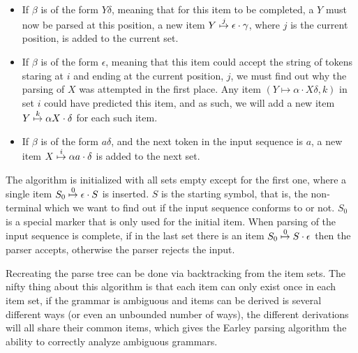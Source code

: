 		\begin{itemize}
			\item

				If $\beta$ is of the form $Y\delta$, meaning that for this item
				to be completed, a $Y$ must now be parsed at this position, a
				new item $\earley{Y}{\epsilon}{\gamma}{j}$, where $j$ is the
				current position, is added to the current set.

			\item

				If $\beta$ is of the form $\epsilon$, meaning that this item
				could accept the string of tokens staring at $i$ and ending at
				the current position, $j$, we must find out why the parsing of
				$X$ was attempted in the first place. Any item $(Y \mapsto
				\alpha \cdot X\delta, k)$ in set $i$  could have predicted this
				item, and as such, we will add a new item $\earley{Y}{\alpha
				X}{\delta}{k}$ for each such item.

			\item

				If $\beta$ is of the form $a\delta$, and the next token in the
				input sequence is $a$, a new item $\earley{X}{\alpha
				a}{\delta}{i}$ is added to the next set.

		\end{itemize}

		The algorithm is initialized with all sets empty except for the first
		one, where a single item $\earley{S_0}{\epsilon}{S}{0}$ is inserted.
		$S$ is the starting symbol, that is, the non-terminal which we want to
		find out if the input sequence conforms to or not. $S_0$ is a special
		marker that is only used for the initial item. When parsing of the
		input sequence is complete, if in the last set there is an item
		$\earley{S_0}{S}{\epsilon}{0}$ then the parser accepts, otherwise the
		parser rejects the input.

		Recreating the parse tree can be done via backtracking from the item
		sets. The nifty thing about this algorithm is that each item can only
		exist once in each item set, if the grammar is ambiguous and items can
		be derived is several different ways (or even an unbounded number of
		ways), the different derivations will all share their common items,
		which gives the Earley parsing algorithm the ability to correctly
		analyze ambiguous grammars.


